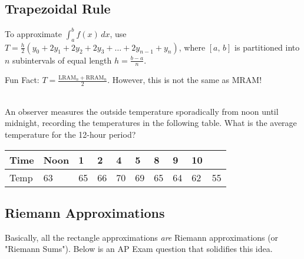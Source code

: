 \documentclass[addpoints, 12pt]{exam}
\newcommand\Tstrut{\rule{0pt}{2.6ex}}         %
\newcommand\Bstrut{\rule[-0.9ex]{0pt}{0pt}}   %
\begin{document}
\subsection*{Trapezoidal Rule}
\begin{tcolorbox}[title= THE TRAPEZOIDAL RULE, black,sharp corners,colback=white,colbacktitle=white,coltitle=black,boxrule=1pt]

    To approximate $\displaystyle\int_a^b f(x)\,dx$, use $\displaystyle T=\frac{h}{2}\left(y_0+2y_1+2y_2+2y_3+\dots+2y_{n-1}+y_n\right)$,
    where $[a,\,b]$ is partitioned into $n$ subintervals of equal length $\displaystyle h=\frac{b-a}{n}$.
    
\end{tcolorbox}

Fun Fact: $\displaystyle T=\frac{\text{LRAM}_n+\text{RRAM}_n}{2}$. However, this is not the same as MRAM!\\
\\
\begin{questions}
    \question An observer measures the outside temperature sporadically from noon until midnight, recording the temperatures in the following table. What is the average temperature for the 12-hour period?
    
    \begin{longtable}{|C{.9cm}|C{.9cm}|C{.5cm}|C{.5cm}|C{.5cm}|C{.5cm}|C{.5cm}|C{.5cm}|C{.5cm}|C{1.4cm}|}
        \hline
        Time \Tstrut\Bstrut & Noon \Tstrut\Bstrut & 1 \Tstrut\Bstrut & 2 \Tstrut\Bstrut & 4 \Tstrut\Bstrut & 5 \Tstrut\Bstrut & 8 \Tstrut\Bstrut & 9 \Tstrut\Bstrut & 10\Tstrut\Bstrut & \Tstrut\Bstrut \\\hline
        Temp \Tstrut\Bstrut & 63\Tstrut\Bstrut & 65\Tstrut\Bstrut & 66\Tstrut\Bstrut & 70\Tstrut\Bstrut & 69\Tstrut\Bstrut & 65\Tstrut\Bstrut & 64\Tstrut\Bstrut & 62\Tstrut\Bstrut & 55\Tstrut\Bstrut \\\hline
    \end{longtable}  
    
    
\end{questions}


\subsection*{Riemann Approximations}
Basically, all the rectangle approximations \textit{are} Riemann approximations (or "Riemann Sums"). Below is an AP Exam question that solidifies this idea.
\end{document}
